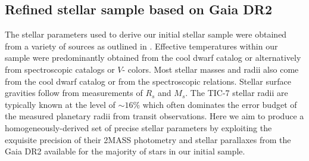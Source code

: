 \subsection{Refined stellar sample based on Gaia DR2} \label{sect:gaia}
The stellar parameters used to derive our initial stellar sample were obtained from a variety of sources
as outlined in \cite{stassun17}. Effective temperatures within our sample were predominantly obtained
from the cool dwarf catalog \citep{muirhead18} or alternatively from spectroscopic catalogs or $V$-\Ks{}
colors.
Most stellar masses and radii also come from the cool dwarf catalog or from the \cite{torres10}
spectroscopic relations. Stellar surface gravities follow from measurements of $R_s$ and $M_s$.
The TIC-7 stellar radii are typically known at the level of $\sim 16$\% which often dominates
the error budget of the measured planetary radii from transit observations. Here we aim to produce a
homogeneously-derived set of precise stellar parameters by exploiting the exquisite precision of their
2MASS photometry and stellar parallaxes from the Gaia DR2 \cite{gaia18} available for the majority of
stars in our initial sample. \\

